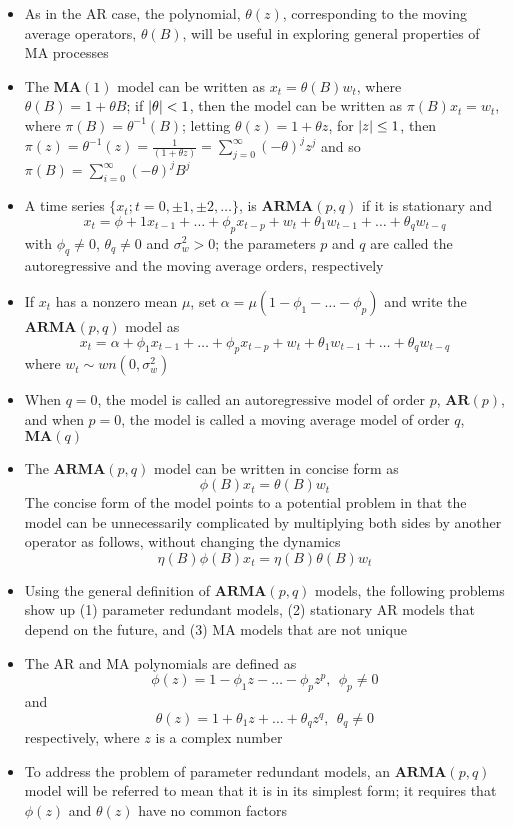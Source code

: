 \documentclass[12pt]{article}
\newcommand{\ar}[1]{$\mathbf{AR}(#1)$}
\newcommand{\ma}[1]{$\mathbf{MA}(#1)$}
\newcommand{\arma}[2]{$\mathbf{ARMA}(#1, #2)$}
\begin{document}
\begin{itemize}
\item As in the AR case, the polynomial, $\theta(z)$, corresponding to the moving average operators, $\theta(B)$, will be useful in exploring general properties of MA processes
\item The \ma{1} model can be written as $x_t = \theta(B)w_t$, where $\theta(B) = 1 + \theta B$; if $\abs{\theta} < 1$, then the model can be written as $\pi(B)x_t = w_t$, where $\pi(B) = \theta^{-1}(B)$; letting $\theta(z) = 1 + \theta z$, for $\abs{z} \leq 1$, then $\pi(z) = \theta^{-1}(z) = \frac{1}{(1 + \theta z)} = \sum_{j=0}^\infty (-\theta)^jz^j$ and so $\pi(B) = \sum_{i=0}^\infty (-\theta)^jB^j$
\item A time series $\{x_t; t = 0, \pm 1, \pm 2, \dots\}$,  is \arma{p}{q} if it is stationary and $$ x_t = \phi+1x_{t-1} + \dots + \phi_px_{t-p} + w_t + \theta_1w_{t-1} + \dots + \theta_qw_{t-q} $$ with $\phi_q \neq 0$, $\theta_q \neq 0$ and $\sigma^2_w > 0$; the parameters $p$ and $q$ are called the autoregressive and the moving average orders, respectively
\item If $x_t$ has a nonzero mean $\mu$, set $\alpha = \mu(1 - \phi_1 - \dots - \phi_p)$ and write the \arma{p}{q} model as $$ x_t = \alpha + \phi_1x_{t-1} + \dots + \phi_px_{t-p} + w_t + \theta_1w_{t-1} + \dots + \theta_qw_{t-q} $$ where $w_t \sim wn(0, \sigma^2_w)$
\item When $q = 0$, the model is called an autoregressive model of order $p$, \ar{p}, and when $p=0$, the model is called a moving average model of order $q$, \ma{q}
\item The \arma{p}{q} model can be written in concise form as $$ \phi(B)x_t = \theta(B)w_t $$ The concise form of the model points to a potential problem in that the model can be unnecessarily complicated by multiplying both sides by another operator as follows, without changing the dynamics
$$ \eta(B)\phi(B)x_t = \eta(B)\theta(B)w_t $$ 
\item Using the general definition of \arma{p}{q} models, the following problems show up (1) parameter redundant models, (2) stationary AR models that depend on the future, and (3) MA models that are not unique
\item The AR and MA polynomials are defined as $$ \phi(z) = 1 - \phi_1z - \dots - \phi_pz^p, ~~ \phi_p \neq 0 $$ and $$ \theta(z) = 1 + \theta_1z + \dots + \theta_qz^q, ~~ \theta_q \neq 0 $$ respectively, where $z$ is a complex number
\item To address the problem of parameter redundant models, an \arma{p}{q} model will be referred to mean that it is in its simplest form; it requires that $\phi(z)$ and $\theta(z)$ have no common factors

\end{itemize}
\end{document}
